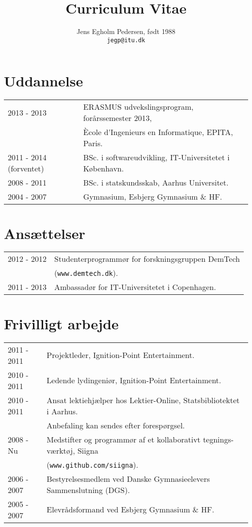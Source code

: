 \documentclass[12pt,a4paper,notitlepage]{article}
\author{Jens Egholm Pedersen, født 1988 
\\ \texttt{jegp@itu.dk}
}
\title{Curriculum Vitae}
\begin{document}
\maketitle
\section*{Uddannelse}
\begin{tabular}{l l }
2013 - 2013 & ERASMUS udvekslingsprogram, forårssemester 2013, \\
            & Ècole d'Ingenieurs en Informatique, EPITA, Paris. \\
2011 - 2014 (forventet) & BSc. i softwareudvikling, IT-Universitetet i København. \\
2008 - 2011 & BSc. i statskundsskab, Aarhus Universitet. \\
2004 - 2007 & Gymnasium, Esbjerg Gymnasium \& HF.
\end{tabular}

\section*{Ansættelser}
\begin{tabular}{l l }
2012 - 2012 & Studenterprogrammør for forskningsgruppen DemTech \\ & (\texttt{www.demtech.dk}). \\
2011 - 2013 & Ambassadør for IT-Universitetet i Copenhagen.
\end{tabular}

\section*{Frivilligt arbejde}
\begin{tabular}{l l }
2011 - 2011 & Projektleder, Ignition-Point Entertainment. \\
2010 - 2011 & Ledende lydingeniør, Ignition-Point Entertainment. \\
2010 - 2011 & Ansat lektiehjælper hos Lektier-Online, Statsbibliotektet i Aarhus. \\ & Anbefaling kan sendes efter forespørgsel. \\
2008 - Nu & Medstifter og programmør af et kollaborativt tegnings-værktøj, Siigna \\ & (\texttt{www.github.com/siigna}). \\
2006 - 2007 & Bestyrelsesmedlem ved Danske Gymnasieelevers Sammenslutning (DGS). \\
2005 - 2007 & Elevrådsformand ved Esbjerg Gymnasium \& HF. \\
\end{tabular}
\end{document}
